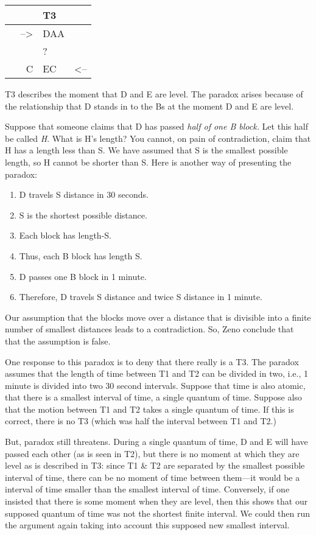 \documentclass[oneside]{article}
\begin{document}
\begin{longtable}[c]{@{}rll@{}}
\toprule
& T3 &\tabularnewline
\midrule
\endhead
--\textgreater{} & DAA &\tabularnewline
& ? &\tabularnewline
~ ~ C & EC~ & \textless{}--\tabularnewline
\end{longtable}

T3 describes the moment that D and E are level. The paradox arises because of the relationship that D stands in to the Bs at the moment D and E are level.

Suppose that someone claims that D has passed \emph{half
of one B block.} Let this half be called \emph{H}. What is H's length?
You cannot, on pain of contradiction, claim that H has a length less
than S. We have assumed that S is the smallest possible length, so H
cannot be shorter than S. Here is another way of presenting the paradox:

\begin{enumerate}
\item D travels S distance in 30 seconds. 
\item S is the shortest possible distance. 
\item Each block has length-S.
\item Thus, each B block has length S.
\item D passes one B block in 1 minute. 
\item Therefore, D travels S distance and twice S distance in 1 minute. 
\end{enumerate} 
Our assumption that the blocks move over a distance that is divisible into a finite number of smallest distances leads to a contradiction. So, Zeno conclude that that the assumption is false. 

One response to this paradox is to deny that there really is a T3. The paradox assumes that the length of time between T1 and T2 can be divided in two, i.e., 1 minute is divided into two 30
second intervals. Suppose that time is also atomic, that there is a
smallest interval of time, a single quantum of time. Suppose also that
the motion between T1 and T2 takes a single quantum of time. If this is
correct, there is no T3 (which was half the interval between T1 and T2.) 

But, paradox still threatens. During a single quantum of time, D and E will
have passed each other (as is seen in T2), but there is no moment at
which they are level as is described in T3: since T1 \& T2 are
separated by the smallest possible interval of time, there can be no moment of time between them---it would be a interval of time smaller than the smallest interval of time. Conversely, if one insisted that there is some moment when they are level, then this shows that our supposed quantum of time was not the shortest finite interval. We could then run the argument again taking into account this supposed new smallest interval.
\end{document}

